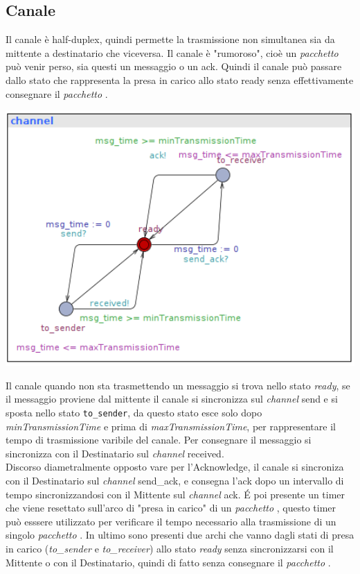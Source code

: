 \documentclass[a4paper]{article}
\newcommand{\channel}{\textit{channel }}
\newcommand{\pacchetto}{\textit{pacchetto }}
\begin{document}
\subsection{Canale}
Il canale è half-duplex, quindi permette la trasmissione non simultanea sia da mittente a destinatario che viceversa.
Il canale è "rumoroso", cioè un \textit{\pacchetto}può venir perso, sia questi un messaggio o un ack. Quindi il canale può passare dallo stato che rappresenta la presa in carico allo stato ready senza effettivamente consegnare il \pacchetto.\\
\begin{center}\includegraphics[width=1\textwidth]{channel_unsafe.png}\end{center}
Il canale quando non sta trasmettendo un messaggio si trova nello stato \textit{ready}, se il messaggio proviene dal mittente il canale si sincronizza sul \channel send e si sposta nello stato \texttt{to\_sender}, da questo stato esce solo dopo \textit{minTransmissionTime} e prima di \textit{maxTransmissionTime}, per rappresentare il tempo di trasmissione varibile del canale.
Per consegnare il messaggio si sincronizza con il Destinatario sul \channel received.\\
Discorso diametralmente opposto vare per l'Acknowledge, il canale si sincroniza con il Destinatario sul \channel send\_ack, e consegna l'ack dopo un intervallo di tempo sincronizzandosi con il Mittente sul \channel ack.
É poi presente un timer che viene resettato sull'arco di "presa in carico" di un \pacchetto, questo timer può esssere utilizzato per verificare il tempo necessario alla trasmissione di un singolo \pacchetto.
In ultimo sono presenti due archi che vanno dagli stati di presa in carico (\textit{to\_sender} e \textit{to\_receiver}) allo stato \textit{ready} senza sincronizzarsi con il Mittente o con il Destinatario, quindi di fatto senza consegnare il \pacchetto.
\end{document}
